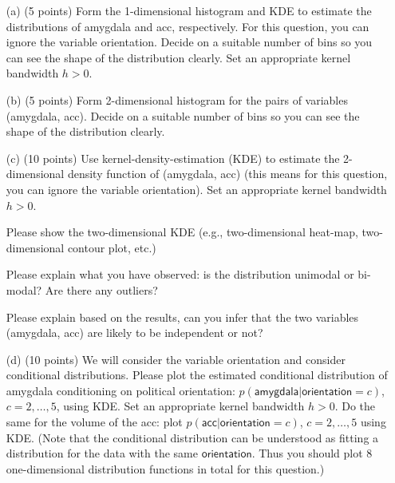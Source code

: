 \documentclass[12pt]{article}
\begin{document}
 \begin{enumerate}
 
 
 \item[(a)] (5 points) Form the 1-dimensional histogram and KDE to estimate the distributions of \textsf{amygdala} and \textsf{acc}, respectively. For this question, you can ignore the variable \textsf{orientation}. Decide on a suitable number of bins so you can see the shape of the distribution clearly. Set an appropriate kernel bandwidth $h >0$. 
 
 
 
 \item[(b)] (5 points) Form 2-dimensional histogram for the pairs of variables (\textsf{amygdala}, \textsf{acc}). Decide on a suitable number of bins so you can see the shape of the distribution clearly. 
 
 \item[(c)] (10 points) Use kernel-density-estimation (KDE) to estimate the 2-dimensional density function of (\textsf{amygdala}, \textsf{acc}) (this means for this question, you can ignore the variable \textsf{orientation}). Set an appropriate kernel bandwidth $h >0$. 

Please show the two-dimensional KDE (e.g., two-dimensional heat-map, two-dimensional contour plot, etc.)

Please explain what you have observed: is the distribution unimodal or bi-modal? Are there any outliers?

Please explain based on the results, can you infer that the two variables (\textsf{amygdala}, \textsf{acc}) are likely to be independent or not?

 \item[(d)] (10 points) We will consider the variable \textsf{orientation} and consider conditional distributions. Please plot the estimated conditional distribution of \textsf{amygdala} conditioning on political \textsf{orientation}: $p(\textsf{amygdala}|\textsf{orientation}=c)$, $c = 2, \ldots, 5$, using KDE. Set an appropriate kernel bandwidth $h >0$.  Do the same for the volume of the \textsf{acc}: plot $p(\textsf{acc}|\textsf{orientation}=c)$, $c = 2, \ldots, 5$ using KDE. (Note that the conditional distribution can be understood as fitting a distribution for the data with the same $\textsf{orientation}$. Thus you should plot 8 one-dimensional distribution functions in total for this question.) 
 

\end{enumerate}
\end{document}
